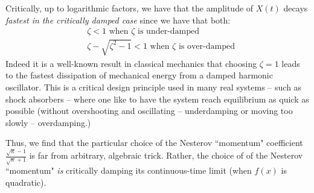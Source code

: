 Critically, up to logarithmic factors, we have that the amplitude of $X(t)$ decays \textit{fastest in the critically damped case} since we have that both:
\begin{align*}
    & \zeta < 1 \text{ when } \zeta \text{ is under-damped} \\
    & \zeta -\sqrt{\zeta^2-1} < 1 \text{ when } \zeta  \text{ is over-damped}
\end{align*}
Indeed it is a well-known result in classical mechanics that choosing $\zeta=1$ leads to the fastest dissipation of mechanical energy from a damped harmonic oscillator. This is a critical design principle used in many real systems -- such as shock absorbers -- where one like to have the system reach equilibrium as quick as possible (without overshooting and oscillating -- underdamping or moving too slowly -- overdamping.)

Thus, we find that the particular choice of the Nesterov ``momentum" coefficient $\frac{\sqrt{\kappa}-1}{\sqrt{\kappa}+1}$ is far from arbitrary, algebraic trick. Rather, the choice of of the Nesterov ``momentum" \textit{is} critically damping its continuous-time limit (when $f(x)$ is quadratic).


